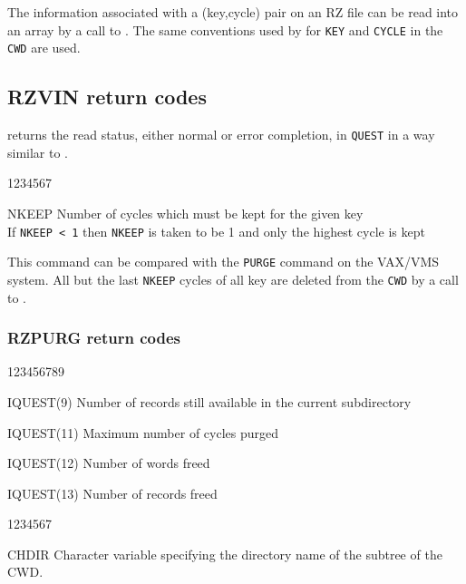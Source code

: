 The information associated with a (key,cycle) pair on an RZ file can
be read into an array by a call to .
The same conventions used by  for {\tt KEY} and 
{\tt CYCLE} in the {\tt CWD} are used.

\subsection*{RZVIN return codes}

 returns the read status, either normal or error completion,
in {\tt QUEST} in a way similar to .




\begin{DLtt}{1234567}
\item[NKEEP]Number of cycles which must be kept for the given key\\
If {\tt NKEEP < 1} then {\tt NKEEP} is taken to be 1 and only the
highest cycle is kept
\end{DLtt}

This command can be compared with 
the {\tt PURGE} command on the VAX/VMS system.
All but the last {\tt NKEEP} cycles of all
key are deleted from the {\tt CWD} by a call to .

\subsubsection*{RZPURG return codes}
\begin{DLtt}{123456789}
\item[IQUEST(9)]Number of records still available in the current subdirectory
\par
\item[IQUEST(11)]Maximum number of cycles purged
\item[IQUEST(12)]Number of words freed
\item[IQUEST(13)]Number of records freed
\end{DLtt}



\begin{DLtt}{1234567}
\item[CHDIR]Character variable specifying the directory name of the subtree of
the CWD.
\end{DLtt}

